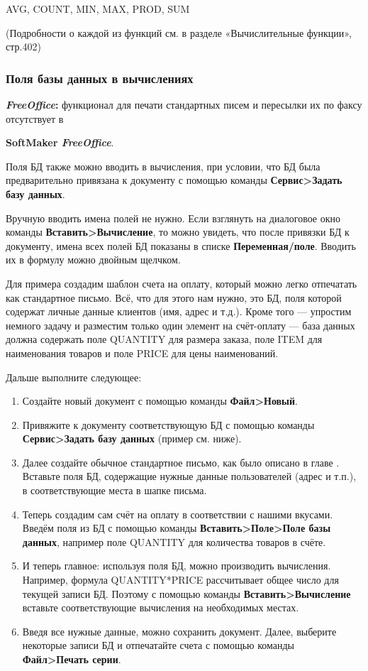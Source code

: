 ﻿\documentclass[a4paper,10pt]{article}
\begin{document}
AVG, COUNT, MIN, MAX, PROD, SUM

(Подробности о каждой из функций см. в разделе «Вычислительные функции», стр.402)

\subsubsection{Поля базы данных в вычислениях}
\begin{mdframed}[backgroundcolor=pink!50]
\textbf{\textit{FreeOffice}:} функционал для печати стандартных писем и пересылки их по факсу отсутствует в 

\textbf{SoftMaker \textit{FreeOffice}}.
\end{mdframed}

Поля БД также можно вводить в вычисления, при условии, что БД была предварительно привязана к документу с помощью команды \textbf{Сервис>Задать базу данных}.

Вручную вводить имена полей не нужно. Если взглянуть на диалоговое окно команды \textbf{Вставить>Вычисление}, то можно увидеть, что после привязки БД к документу, имена всех полей БД показаны в списке \textbf{Переменная/поле}. Вводить их в формулу можно двойным щелчком.

Для примера создадим шаблон счета на оплату, который можно легко отпечатать как стандартное письмо. Всё, что для этого нам нужно, это БД, поля которой содержат личные данные клиентов (имя, адрес и т.д.). Кроме того — упростим немного задачу и разместим только один элемент на счёт-оплату — база данных должна содержать поле QUANTITY для размера заказа, поле ITEM для  наименования товаров и поле PRICE для цены наименований.

Дальше выполните следующее:
\begin{enumerate}
 \item Создайте новый документ с помощью команды \textbf{Файл>Новый}.
 \item Привяжите к документу соответствующую БД с помощью команды \textbf{Сервис>Задать базу данных} (пример см. ниже).
 \item Далее создайте обычное стандартное письмо, как было описано в главе . Вставьте поля БД, содержащие нужные данные пользователей (адрес и т.п.), в соответствующие места в шапке письма.
 \item Теперь создадим сам счёт на оплату в соответствии с нашими вкусами. Введём поля из БД с помощью команды \textbf{Вставить>Поле>Поле базы данных}, например поле QUANTITY для количества товаров в счёте.
 \item И теперь главное: используя поля БД, можно производить вычисления. Например, формула QUANTITY*PRICE рассчитывает общее число для текущей записи БД. Поэтому с помощью команды \textbf{Вставить>Вычисление} вставьте соответствующие вычисления на необходимых местах.
 \item Введя все нужные данные, можно сохранить документ. Далее, выберите некоторые записи БД и отпечатайте счета с помощью команды \textbf{Файл>Печать серии}.
\end{enumerate}
\end{document}

